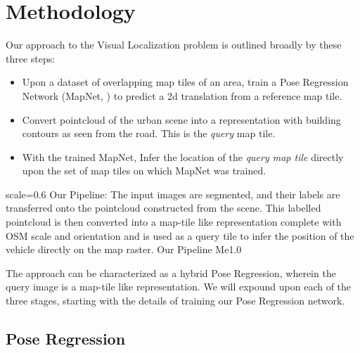 
\chapter{Methodology}
\label{Methodology}
Our approach to the Visual Localization problem is outlined broadly by these three steps:

\begin{itemize}
	\item Upon a dataset of overlapping map tiles of an area, train a Pose Regression Network (MapNet, \cite{Brahmbhatt2018}) to predict a 2d translation from a reference map tile. \\
	
	\item Convert pointcloud of the urban scene into a representation with building contours as seen from the road. This is the \emph{query} map tile.\\
	
	\item With the trained MapNet, Infer the location of the \emph{query map tile} directly upon the set of map tiles on which MapNet was trained.\\  
\end{itemize}

{scale=0.6}%
{Our Pipeline: The input images are segmented, and their labels are transferred onto the pointcloud constructed from the scene. This labelled pointcloud is then converted into a map-tile like representation complete with OSM scale and orientation and is used as a query tile to infer the position of the vehicle directly on the map raster.}%
{Our Pipeline}%
{Me1.0} 

The approach can be characterized as a hybrid Pose Regression, wherein the query image is a map-tile like representation. We will expound upon each of the three stages, starting with the details of training our Pose Regression network.   

\newpage
\section{Pose Regression}
